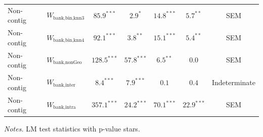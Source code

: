 \begin{table}[htbp]
\begin{tabular}{llccccc}
    Non-contig & $W_{\text{bank,bin,knn3}}$ & $85.9^{***}$ & $2.9^{*}$ & $14.8^{***}$ & $5.7^{**}$ & SEM \\
    Non-contig & $W_{\text{bank,bin,knn4}}$ & $92.1^{***}$ & $3.8^{**}$ & $15.1^{***}$ & $5.4^{**}$ & SEM \\
    Non-contig & $W_{\text{bank,nonGeo}}$ & $128.5^{***}$ & $57.8^{***}$ & $6.5^{**}$ & $0.0$ & SEM \\
    Non-contig & $W_{\text{bank,inter}}$ & $8.4^{***}$ & $7.9^{***}$ & $0.1$ & $0.4$ & Indeterminate \\
    Non-contig & $W_{\text{bank,intra}}$ & $357.1^{***}$ & $24.2^{***}$ & $70.1^{***}$ & $22.9^{***}$ & SEM \\
    \bottomrule
  \end{tabular}
  \begin{tablenotes}\footnotesize
  \item \emph{Notes.} LM test statistics with p-value stars.
  \end{tablenotes}
\end{table}

\clearpage
 
